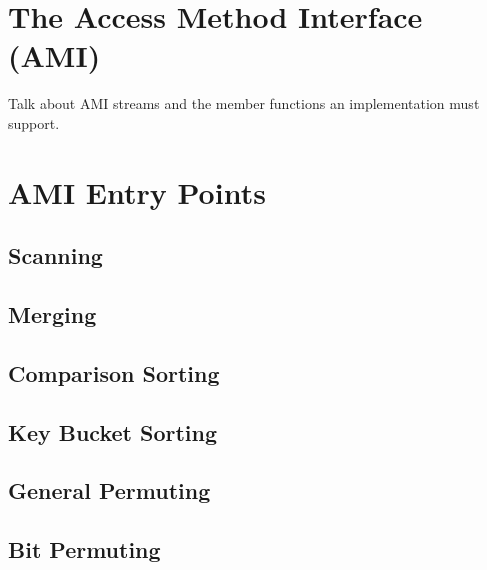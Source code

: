 \section{The Access Method Interface (AMI)}
\label{sec:ref-ami}

Talk about AMI streams and the member functions an implementation must
support. 

\section{AMI Entry Points}
\label{sec:ref-entry}

\subsection{Scanning}
\label{sec:ref-imp-ami-scan}


\subsection{Merging}
\label{sec:ref-imp-ami-merge}


\subsection{Comparison Sorting}
\label{sec:ref-imp-ami-sort}


\subsection{Key Bucket Sorting}
\label{sec:ref-imp-ami-kb-sort}


\subsection{General Permuting}
\label{sec:ref-imp-ami-gp}


\subsection{Bit Permuting}
\label{sec:ref-imp-ami-bp}

